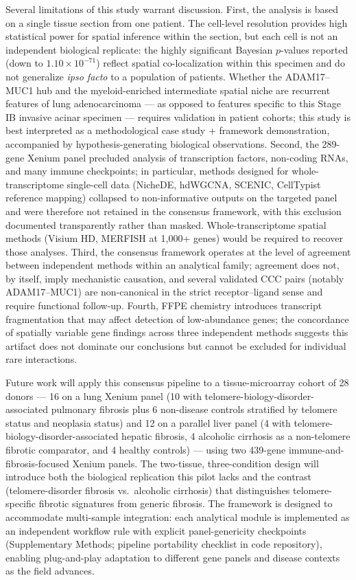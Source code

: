 \documentclass[12pt,a4paper]{article}
\begin{document}
Several limitations of this study warrant discussion. First, the analysis is based on a single tissue section from one patient. The cell-level resolution provides high statistical power for spatial inference within the section, but each cell is not an independent biological replicate: the highly significant Bayesian $p$-values reported (down to $1.10 \times 10^{-71}$) reflect spatial co-localization within this specimen and do not generalize \emph{ipso facto} to a population of patients. Whether the ADAM17--MUC1 hub and the myeloid-enriched intermediate spatial niche are recurrent features of lung adenocarcinoma --- as opposed to features specific to this Stage IB invasive acinar specimen --- requires validation in patient cohorts; this study is best interpreted as a methodological case study + framework demonstration, accompanied by hypothesis-generating biological observations. Second, the 289-gene Xenium panel precluded analysis of transcription factors, non-coding RNAs, and many immune checkpoints; in particular, methods designed for whole-transcriptome single-cell data (NicheDE, hdWGCNA, SCENIC, CellTypist reference mapping) collapsed to non-informative outputs on the targeted panel and were therefore not retained in the consensus framework, with this exclusion documented transparently rather than masked. Whole-transcriptome spatial methods (Visium HD, MERFISH at 1,000+ genes) would be required to recover those analyses. Third, the consensus framework operates at the level of agreement between independent methods within an analytical family; agreement does not, by itself, imply mechanistic causation, and several validated CCC pairs (notably ADAM17--MUC1) are non-canonical in the strict receptor--ligand sense and require functional follow-up. Fourth, FFPE chemistry introduces transcript fragmentation that may affect detection of low-abundance genes; the concordance of spatially variable gene findings across three independent methods suggests this artifact does not dominate our conclusions but cannot be excluded for individual rare interactions.

Future work will apply this consensus pipeline to a tissue-microarray cohort of 28 donors --- 16 on a lung Xenium panel (10 with telomere-biology-disorder-associated pulmonary fibrosis plus 6 non-disease controls stratified by telomere status and neoplasia status) and 12 on a parallel liver panel (4 with telomere-biology-disorder-associated hepatic fibrosis, 4 alcoholic cirrhosis as a non-telomere fibrotic comparator, and 4 healthy controls) --- using two 439-gene immune-and-fibrosis-focused Xenium panels. The two-tissue, three-condition design will introduce both the biological replication this pilot lacks and the contrast (telomere-disorder fibrosis vs.\ alcoholic cirrhosis) that distinguishes telomere-specific fibrotic signatures from generic fibrosis. The framework is designed to accommodate multi-sample integration: each analytical module is implemented as an independent workflow rule with explicit panel-genericity checkpoints (Supplementary Methods; pipeline portability checklist in code repository), enabling plug-and-play adaptation to different gene panels and disease contexts as the field advances.
\end{document}
